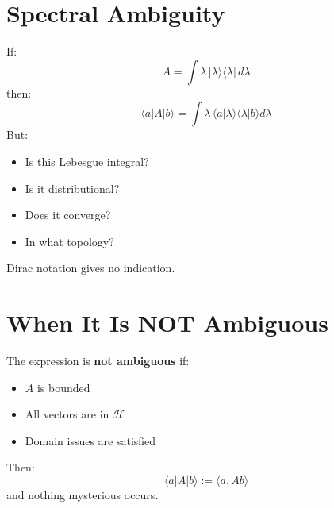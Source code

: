 \documentclass[12pt]{article}
\begin{document}
\section{ Spectral Ambiguity}\label{spectral-ambiguity}
If:
\[A = \int \lambda\, | \lambda\rangle\langle\lambda|\, d\lambda\]
then:
\[\langle a|A|b\rangle
= \int \lambda\, \langle a|\lambda\rangle\langle\lambda|b\rangle d\lambda\]
But:
\begin{itemize}
\item
  Is this Lebesgue integral?
\item
  Is it distributional?
\item
  Does it converge?
\item
  In what topology?
\end{itemize}
Dirac notation gives no indication.
\section{ When It Is NOT Ambiguous}\label{when-it-is-not-ambiguous}
The expression is \textbf{not ambiguous} if:
\begin{itemize}
\item
  \(A\) is bounded
\item
  All vectors are in \(\mathcal H\)
\item
  Domain issues are satisfied
\end{itemize}
Then:
\[\boxed{\langle a|A|b\rangle := \langle a, A b\rangle}\]
and nothing mysterious occurs.
\end{document}
